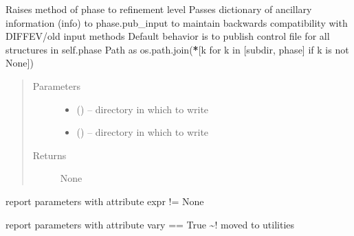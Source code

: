 \documentclass[letterpaper,10pt,english]{sphinxmanual}
\begin{document}
\begin{fulllineitems}
\begin{fulllineitems}
\end{fulllineitems}


\begin{fulllineitems}
\label{\detokenize{rst/refinement:mstack.refinement.Refinement.pub_input}}
Raises method of phase to refinement level
Passes dictionary of ancillary information (info) to phase.pub\_input to
maintain backwards compatibility with DIFFEV/old input methods
Default behavior is to publish control file for all structures in self.phase
Path as os.path.join({\color{red}\bfseries{}*}{[}k for k in {[}subdir, phase{]} if k is not None{]})
\begin{quote}\begin{description}
\item[{Parameters}] \leavevmode\begin{itemize}
\item {} 
 () -- directory in which to write

\item {} 
 () -- directory in which to write

\end{itemize}

\item[{Returns}] \leavevmode
None

\end{description}\end{quote}

\end{fulllineitems}


\begin{fulllineitems}
\label{\detokenize{rst/refinement:mstack.refinement.Refinement.report_constrained}}
report parameters with attribute expr != None

\end{fulllineitems}


\begin{fulllineitems}
\label{\detokenize{rst/refinement:mstack.refinement.Refinement.report_refined}}
report parameters with attribute vary == True
\textasciitilde{}! moved to utilities


\end{fulllineitems}
\end{fulllineitems}
\end{document}
